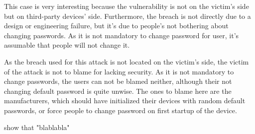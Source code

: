 \documentclass[a4paper,man,natbib,12]{apa6}
\begin{document}
\quad This case is very interesting because the vulnerability is not on the victim’s side but on third-party devices’ side. Furthermore, the breach is not directly due to a design or engineering failure, but it’s due to people’s not bothering about changing passwords. As it is not mandatory to change password for user, it’s assumable that people will not change it. 

\quad As the breach used for this attack is not located on the victim’s side, the victim of the attack is not to blame for lacking security. As it is not mandatory to change passwords, the users can not be blamed neither, although their not changing default password is quite unwise. The ones to blame here are the manufacturers, which should have initialized their devices with random default passwords, or force people to change password on first startup of the device. 

show that "blablabla"\cite{46301}


\end{document}
